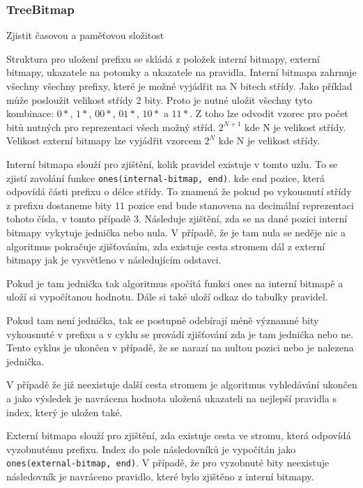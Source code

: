 \subsubsection{TreeBitmap} %

Zjistit časovou a paměťovou složitost

Struktura pro uložení prefixu se skládá z položek interní bitmapy, externí bitmapy, ukazatele na potomky
a ukazatele na pravidla. Interní bitmapa zahrnuje všechny všechny prefixy,
které je možné vyjádřit na N bitech střídy. Jako příklad může posloužit velikost střídy 2 bity.
Proto je nutné uložit všechny tyto kombinace: $0*$, $1*$, $00*$, $01*$, $10*$ a $11*$.
Z toho lze odvodit vzorec pro počet bitů nutných pro reprezentaci všech možný stříd.
$2^{N + 1}$ kde N je velikost střídy. Velikost externí bitmapy lze vyjádřit vzorcem $2^N$ kde N je velikost střídy.

Interní bitmapa slouží pro zjištění, kolik pravidel existuje v tomto uzlu.
To se zjistí zavolání funkce \texttt{ones(internal-bitmap, end)}. kde end pozice,
která odpovídá části prefixu o délce střídy.
To znamená že pokud po vykousnutí střídy z prefixu dostaneme bity
$11$ pozice end bude stanovena na decimální reprezentaci tohoto čísla, v tomto případě $3$.
Následuje zjištění, zda se na dané pozici interní bitmapy vykytuje jednička nebo nula.
V případě, že je tam nula se neděje nic a algoritmus pokračuje zjišťováním, zda existuje
cesta stromem dál z externí bitmapy jak je vysvětleno v následujícím odstavci.

Pokud je tam jednička tak algoritmus spočítá funkci ones na interní bitmapě a uloží si vypočítanou
hodnotu. Dále si také uloží odkaz do tabulky pravidel.

Pokud tam není jednička, tak se postupně odebírají méně významné bity vykousnuté v prefixu a v cyklu se provádí
zjišťování zda je tam jednička nebo ne. Tento cyklus je ukončen v případě, že se narazí na nultou pozici
nebo je nalezena jednička.

V případě že již neexistuje další cesta stromem je algoritmus vyhledávání ukončen a jako výsledek
je navrácena hodnota uložená ukazateli na nejlepší pravidla s index, který je uložen také.

Externí bitmapa slouží pro zjištění, zda existuje cesta ve stromu, která odpovídá vyzobnutému prefixu.
Index do pole následovníků je vypočítán jako \texttt{ones(external-bitmap, end)}. V případě,
že pro vyzobnuté bity neexistuje následovník je navráceno pravidlo, které bylo zjištěno z interní bitmapy.

